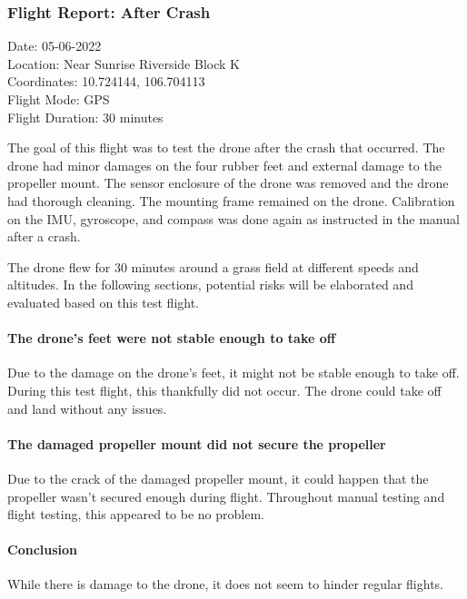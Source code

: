 \newpage
\subsubsection{Flight Report: After Crash}
\begin{minipage}{1\textwidth}
	\begin{flushright}
		Date: 05-06-2022\\
		Location: Near Sunrise Riverside Block K\\
		Coordinates: 10.724144, 106.704113\\
		Flight Mode: \gls{GPS}\\
		Flight Duration: 30 minutes\\\vspace{5mm}
	\end{flushright}
\end{minipage}

The goal of this flight was to test the drone after the crash that occurred. The drone had minor damages on the four rubber feet and external damage to the propeller mount.
The sensor enclosure of the drone was removed and the drone had thorough cleaning. The mounting frame remained on the drone. Calibration on the IMU, gyroscope, and compass was done again as instructed in the manual after a crash. \cite{splashdronemanual}

The drone flew for 30 minutes around a grass field at different speeds and altitudes. In the following sections, potential risks will be elaborated and evaluated based on this test flight.

\paragraph{The drone's feet were not stable enough to take off}
Due to the damage on the drone's feet, it might not be stable enough to take off. During this test flight, this thankfully did not occur. The drone could take off and land without any issues.
\paragraph{The damaged propeller mount did not secure the propeller}
Due to the crack of the damaged propeller mount, it could happen that the propeller wasn't secured enough during flight. Throughout manual testing and flight testing, this appeared to be no problem.


\paragraph{Conclusion}
While there is damage to the drone, it does not seem to hinder regular flights. 